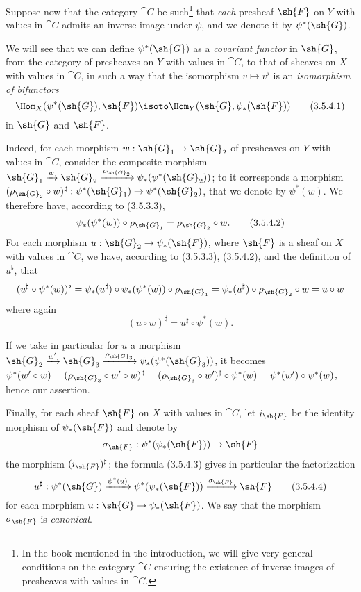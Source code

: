 \begin{env}[3.5.4]
\label{0.3.5.4}
Suppose now that the category $\cat{C}$ be such\footnote{In the book mentioned in the
introduction, we will give very general conditions on the category $\cat{C}$ ensuring
the existence of inverse images of presheaves with values in $\cat{C}$.} that
\emph{each} presheaf $\sh{F}$ on $Y$ with values in $\cat{C}$ admits an inverse image
under $\psi$, and we denote it by $\psi^*(\sh{G})$.

We will see that we can define $\psi^*(\sh{G})$ as a \emph{covariant functor} in
$\sh{G}$, from the category of presheaves on $Y$ with values in $\cat{C}$, to that of
sheaves on $X$ with values in $\cat{C}$, in such a way that the isomorphism
$v\mapsto v^\flat$ is an \emph{isomorphism of bifunctors}
\[
  \Hom_X(\psi^*(\sh{G}),\sh{F})\isoto\Hom_Y(\sh{G},\psi_*(\sh{F}))
  \tag{3.5.4.1}
\]
in $\sh{G}$ and $\sh{F}$.

Indeed, for each morphism $w:\sh{G}_1\to\sh{G}_2$ of presheaves on $Y$ with
values in $\cat{C}$, consider the composite morphism
$\sh{G}_1\xrightarrow{w}\sh{G}_2
  \xrightarrow{\rho_{\sh{G}_2}}\psi_*(\psi^*(\sh{G}_2))$; to it corresponds a
morphism $(\rho_{\sh{G}_2}\circ w)^\sharp:\psi^*(\sh{G}_1)\to\psi^*(\sh{G}_2)$,
that we denote by $\psi^*(w)$. We therefore have, according to (3.5.3.3),
\[
  \psi_*(\psi^*(w))\circ\rho_{\sh{G}_1}=\rho_{\sh{G}_2}\circ w.
  \tag{3.5.4.2}
\]
For each morphism $u:\sh{G}_2\to\psi_*(\sh{F})$, where $\sh{F}$ is a sheaf on
$X$ with values in $\cat{C}$, we have, according to (3.5.3.3), (3.5.4.2), and the
definition of $u^\flat$, that
\[
  (u^\sharp\circ\psi^*(w))^\flat
  =\psi_*(u^\sharp)\circ\psi_*(\psi^*(w))\circ\rho_{\sh{G}_1}
  =\psi_*(u^\sharp)\circ\rho_{\sh{G}_2}\circ w=u\circ w
\]
where again
\[
  (u\circ w)^\sharp=u^\sharp\circ\psi^*(w).
  \tag{3.5.4.3}
\]

If we take in particular for $u$ a morphism
$\sh{G}_2\xrightarrow{w'}\sh{G}_3
  \xrightarrow{\rho_{\sh{G}_3}}\psi_*(\psi^*(\sh{G}_3))$, it becomes
$\psi^*(w'\circ w)=(\rho_{\sh{G}_3}\circ w'\circ w)^\sharp
  =(\rho_{\sh{G}_3}\circ w')^\sharp\circ\psi^*(w)=\psi^*(w')\circ\psi^*(w)$,
hence our assertion.

Finally, for each sheaf $\sh{F}$ on $X$ with values in $\cat{C}$, let $i_\sh{F}$ be
the identity morphism of $\psi_*(\sh{F})$ and denote by
\[
  \sigma_\sh{F}:\psi^*(\psi_*(\sh{F}))\to\sh{F}
\]
the morphism $(i_\sh{F})^\sharp$; the formula (3.5.4.3) gives in particular the
factorization
\[
\label{0.3.5.4.4}
  u^\sharp:\psi^*(\sh{G})\xrightarrow{\psi^*(u)}\psi^*(\psi_*(\sh{F}))
  \xrightarrow{\sigma_\sh{F}}\sh{F}
  \tag{3.5.4.4}
\]
for each morphism $u:\sh{G}\to\psi_*(\sh{F})$. We say that the morphism
$\sigma_\sh{F}$ is \emph{canonical}.
\end{env}

